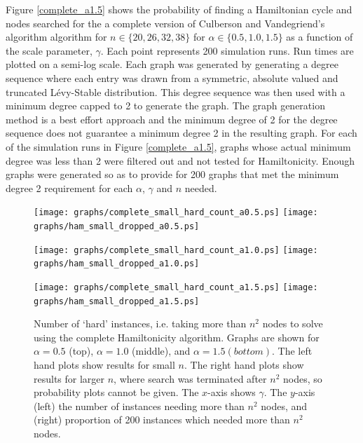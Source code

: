 \documentclass[twoside,11pt]{article}
\begin{document}
Figure \ref{complete_a1.5} shows the probability of finding a Hamiltonian
cycle and nodes searched for
the 
a complete version of Culberson and Vandegriend's algorithm
algorithm for $n \in \{ 20, 26, 32, 38 \}$ for $\alpha \in \{0.5, 1.0, 1.5\}$ as
a function of the scale parameter, $\gamma$.
Each point represents 200 simulation runs.  Run times are plotted on a semi-log scale.
Each graph was generated by 
generating
a degree sequence where each
entry was drawn from a symmetric, absolute valued and truncated L\'evy-Stable distribution.  This degree
sequence was then 
used
with a minimum degree capped to 2 to generate the
graph.
The graph generation method is a best effort approach and the minimum degree of 2 for the degree sequence
does not guarantee a minimum degree 2 in the resulting graph.
For each of the simulation runs in Figure \ref{complete_a1.5}, graphs whose
actual minimum degree was less than 2 were filtered out and not tested for Hamiltonicity.  Enough graphs were
generated so as to provide for 200 graphs that met the minimum degree 2 requirement
for each $\alpha$, $\gamma$ and $n$ needed.

\begin{figure}
\centering
\texttt{[image: graphs/complete\_small\_hard\_count\_a0.5.ps]}
\texttt{[image: graphs/ham\_small\_dropped\_a0.5.ps]}


\texttt{[image: graphs/complete\_small\_hard\_count\_a1.0.ps]}
\texttt{[image: graphs/ham\_small\_dropped\_a1.0.ps]}


\texttt{[image: graphs/complete\_small\_hard\_count\_a1.5.ps]}
\texttt{[image: graphs/ham\_small\_dropped\_a1.5.ps]}


\caption{ Number of `hard' instances, i.e. taking more than $n^2$ nodes to solve using the complete Hamiltonicity algorithm. 
Graphs are shown for $\alpha= 0.5$ (top), $\alpha=1.0$ (middle), and $\alpha=1.5 (bottom)$. 
The left hand plots show results for small $n$. The right hand plots show results for larger $n$, where 
search was terminated after $n^2$ nodes, so probability plots cannot be given.
The $x$-axis shows $\gamma$. The $y$-axis (left) the number of  instances needing more than $n^2$ nodes, and (right) proportion of 200 instances which needed more than $n^2$ nodes.}
\label{hard_complete_a0.5}
\label{hard_complete_a1.0}
\label{small_dropped_a0.5}

\label{hard_complete_a1.5}


\end{figure}
\end{document}
